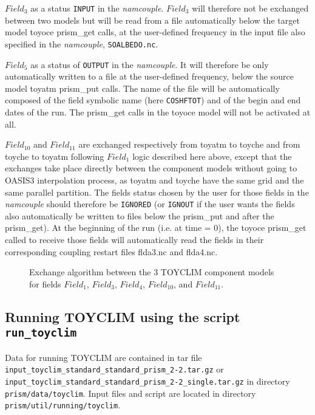 $Field_3$ as a status \texttt{INPUT} in the {\it namcouple}. $Field_3$
will therefore not be exchanged between two models but will be read
from a file automatically below the target model toyoce prism\_get
calls, at the user-defined frequency in the input file also specified
in the {\it namcouple}, \texttt{SOALBEDO.nc}.

$Field_5$ as a status of \texttt{OUTPUT} in the {\it namcouple}. It
will therefore be only automatically written to a file at the
user-defined frequency, below the source model toyatm prism\_put calls.  The
name of the file will be automatically composed of the field symbolic
name (here \texttt{COSHFTOT}) and of the begin and end dates of the
run. The prism\_get calls in the toyoce model will not be activated at
all.

$Field_{10}$ and $Field_{11}$ are exchanged respectively from toyatm to
toyche and from toyche to toyatm following $Field_1$ logic described here
above, except that the exchanges take place directly between the
component models without going to OASIS3 interpolation process, as toyatm
and toyche have the same grid and the same parallel partition. The
fields status chosen by the user for those fields in the {\it
namcouple} should therefore be \texttt{IGNORED} (or \texttt{IGNOUT} if
the user wants the fields also automatically be written to files below
the prism\_put and after the prism\_get). At the beginning of the run
(i.e. at time = 0), the toyoce prism\_get called to receive those
fields will automatically read the fields in their corresponding
coupling restart files flda3.nc and flda4.nc.

\vspace*{1ex}
\begin{figure}[htbp]
\caption{Exchange algorithm between the 3 TOYCLIM component models for
  fields $Field_1$, $Field_3$,
$Field_4$, $Field_{10}$, and $Field_{11}$. }
\label{fig:toyclimcouplingalgo}
\end{figure}



\subsection{Running TOYCLIM using the script {\tt run\_toyclim}}
\label{subsec_running_toyclim}

Data for running TOYCLIM are contained in tar file {\tt
  input\_toyclim\_standard\_standard\_prism\break \_2-2.tar.gz} or {\tt
  input\_toyclim\_standard\_standard\_prism\_2-2\_single.tar.gz} in
directory {\tt prism/data/toyclim}.  Input files and script are
located in directory {\tt prism/util/running/\break toyclim}.

